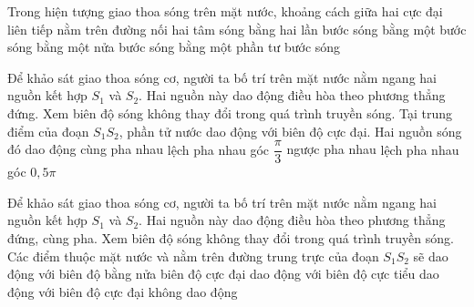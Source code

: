 \begin{ex}
Trong hiện tượng giao thoa sóng trên mặt nước, khoảng cách giữa hai cực đại liên tiếp nằm trên đường nối hai tâm sóng
\choice
{bằng hai lần bước sóng}
{bằng một bước sóng}
{\True bằng một nửa bước sóng}
{bằng một phần tư bước sóng}
\loigiai{}
\end{ex}
\begin{ex}%
Để khảo sát giao thoa sóng cơ, người ta bố trí trên mặt nước nằm ngang hai nguồn kết hợp $S_1$ và $S_2$. Hai nguồn này dao động điều hòa theo phương thẳng đứng. Xem biên độ sóng không thay đổi trong quá trình truyền sóng. Tại trung điểm của đoạn $S_1S_2$, phần tử nước dao động với biên độ cực đại. Hai nguồn sóng đó dao động
\choice
{\True cùng pha nhau}
{lệch pha nhau góc $\dfrac{\pi}{3}$}
{ngược pha nhau}
{lệch pha nhau góc $0,5\pi$}
\end{ex} 
\begin{ex}%
Để khảo sát giao thoa sóng cơ, người ta bố trí trên mặt nước nằm ngang hai nguồn kết hợp $S_1$ và $S_2$. Hai nguồn này dao động điều hòa theo phương thẳng đứng, cùng pha. Xem biên độ sóng không thay đổi trong quá trình truyền sóng. Các điểm thuộc mặt nước và nằm trên đường trung trực của đoạn $S_1S_2$ sẽ
\choice
{dao động với biên độ bằng nửa biên độ cực đại}
{dao động với biên độ cực tiểu}
{\True dao động với biên độ cực đại}
{không dao động}
\end{ex} 

